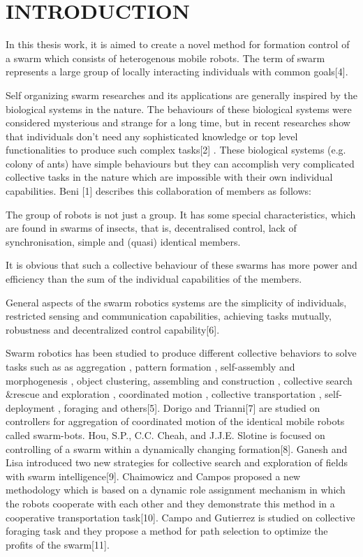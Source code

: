 

\chapter{INTRODUCTION}
\label{chp:introduction}

In this thesis work, it is aimed to create a novel method for formation control of a swarm which consists of heterogenous mobile robots. The term of swarm represents a large group of locally interacting individuals with common goals[4]. 

Self organizing swarm researches and its applications are generally inspired by the biological systems in the nature. 
The behaviours of these biological systems were considered mysterious and strange for a long time, but in recent researches show that individuals don't need any sophisticated knowledge or top level functionalities to produce such complex tasks[2] . These biological systems (e.g. colony of ants) have simple behaviours but they can accomplish very complicated collective tasks in the nature which are impossible with their own individual capabilities. Beni [1] describes this collaboration of members as follows:

The group of robots is not just a group. It has some special characteristics, which are found in swarms of insects, that is, decentralised control, lack of synchronisation, simple and (quasi) identical members.

It is obvious that such a collective behaviour of these swarms has more power and efficiency than the sum of the individual capabilities of the members. 

General aspects of the swarm robotics systems are the simplicity of individuals, restricted sensing and communication capabilities, achieving tasks mutually, robustness and decentralized control capability[6].


Swarm robotics has been studied to produce different collective behaviors to solve tasks such as as aggregation , pattern formation , self-assembly and morphogenesis , object clustering, assembling and construction , collective search$\&$rescue and exploration , coordinated motion , collective transportation , self-deployment , foraging and others[5]. Dorigo and Trianni[7] are studied on controllers for aggregation of coordinated motion of the identical mobile robots called swarm-bots.  Hou, S.P., C.C. Cheah, and J.J.E. Slotine is focused on controlling of a swarm within a dynamically changing formation[8]. Ganesh and Lisa introduced two new strategies for collective search and exploration of fields with swarm intelligence[9]. Chaimowicz and Campos proposed a new methodology which is based on a dynamic role assignment mechanism in which the robots cooperate with each other and they demonstrate this method in a cooperative transportation task[10].  Campo and Gutierrez is studied on collective foraging task and they propose a method for path selection to optimize the profits of the swarm[11].

